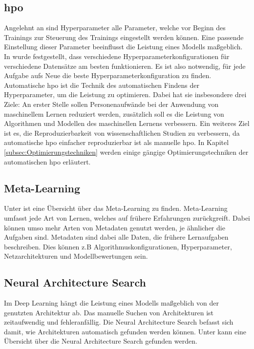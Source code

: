 	\subsection{\acl{hpo}}
	\label{subsec:HyperparameterOptimierung}	
	Angelehnt an \cite{Feurer.2019} sind Hyperparameter alle Parameter, welche vor Beginn des Trainings zur Steuerung des Trainings eingestellt werden können. Eine passende Einstellung dieser Parameter beeinflusst die Leistung eines Modells maßgeblich. In \cite{Kohavi.1995} wurde festgestellt, dass verschiedene Hyperparameterkonfigurationen für verschiedene Datensätze am besten funktionieren. Es ist also notwendig, für jede Aufgabe aufs Neue die beste Hyperparameterkonfiguration zu finden. Automatische \ac{hpo} ist die Technik des automatischen Findens der Hyperparameter, um die Leistung zu optimieren. Dabei hat sie insbesondere drei Ziele: An erster Stelle sollen Personenaufwände bei der Anwendung von maschinellem Lernen reduziert werden, zusätzlich soll es die Leistung von Algorithmen und Modellen des maschinellen Lernens verbessern. Ein weiteres Ziel ist es, die Reproduzierbarkeit von wissenschaftlichen Studien zu verbessern, da automatische \ac{hpo} einfacher reproduzierbar ist als manuelle \ac{hpo}. In Kapitel \ref{subsec:Optimierungstechniken} werden einige gängige Optimierungstechniken der automatischen \ac{hpo} erläutert. 	 
		
	\subsection{Meta-Learning}
	\label{subsec:MetaLearning}
	Unter \cite{JoaquinVanschoren.2018} ist eine Übersicht über das Meta-Learning zu finden. Meta-Learning umfasst jede Art von Lernen, welches auf frühere Erfahrungen zurückgreift. Dabei können umso mehr Arten von Metadaten genutzt werden, je ähnlicher die Aufgaben sind. Metadaten sind dabei alle Daten, die frühere Lernaufgaben beschreiben. Dies können z.B Algorithmuskonfigurationen, Hyperparameter, Netzarchitekturen und Modellbewertungen sein.
	
	\subsection{Neural Architecture Search}
	\label{subsec:NeuralArchitectureSearch}
	Im Deep Learning hängt die Leistung eines Modells maßgeblich von der genutzten Architektur ab. Das manuelle Suchen von Architekturen ist zeitaufwendig und fehleranfällig. Die Neural Architecture Search befasst sich damit, wie Architekturen automatisch gefunden werden können. Unter \cite{Elsken.2019} kann eine Übersicht über die Neural Architecture Search gefunden werden. 	

